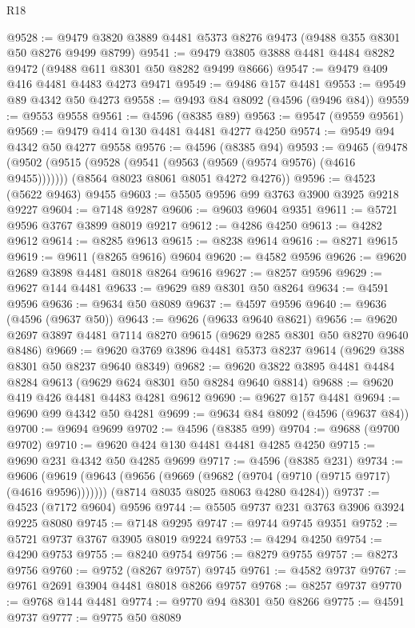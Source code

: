 \begin{lexlean}{R18}
\begin{coremodule}
@9528 := @9479 @3820 @3889 @4481 @5373 @8276 @9473 (@9488 @355 @8301 @50 @8276 @9499 @8799)
@9541 := @9479 @3805 @3888 @4481 @4484 @8282 @9472 (@9488 @611 @8301 @50 @8282 @9499 @8666)
@9547 := @9479 @409 @416 @4481 @4483 @4273 @9471
@9549 := @9486 @157 @4481
@9553 := @9549 @89 @4342 @50 @4273
@9558 := @9493 @84 @8092 (@4596 (@9496 @84))
@9559 := @9553 @9558
@9561 := @4596 (@8385 @89)
@9563 := @9547 (@9559 @9561)
@9569 := @9479 @414 @130 @4481 @4481 @4277 @4250
@9574 := @9549 @94 @4342 @50 @4277 @9558
@9576 := @4596 (@8385 @94)
@9593 := @9465
    (@9478
      (@9502 (@9515 (@9528 (@9541 (@9563 (@9569 (@9574 @9576) (@4616 @9455)))))))
      (@8564 @8023 @8061 @8051 @4272 @4276))
@9596 := @4523 (@5622 @9463) @9455
@9603 := @5505 @9596 @99 @3763 @3900 @3925 @9218 @9227
@9604 := @7148 @9287
@9606 := @9603 @9604 @9351
@9611 := @5721 @9596 @3767 @3899 @8019 @9217
@9612 := @4286 @4250
@9613 := @4282 @9612
@9614 := @8285 @9613
@9615 := @8238 @9614
@9616 := @8271 @9615
@9619 := @9611 (@8265 @9616) @9604
@9620 := @4582 @9596
@9626 := @9620 @2689 @3898 @4481 @8018 @8264 @9616
@9627 := @8257 @9596
@9629 := @9627 @144 @4481
@9633 := @9629 @89 @8301 @50 @8264
@9634 := @4591 @9596
@9636 := @9634 @50 @8089
@9637 := @4597 @9596
@9640 := @9636 (@4596 (@9637 @50))
@9643 := @9626 (@9633 @9640 @8621)
@9656 := @9620 @2697 @3897 @4481 @7114 @8270 @9615 (@9629 @285 @8301 @50 @8270 @9640 @8486)
@9669 := @9620 @3769 @3896 @4481 @5373 @8237 @9614 (@9629 @388 @8301 @50 @8237 @9640 @8349)
@9682 := @9620 @3822 @3895 @4481 @4484 @8284 @9613 (@9629 @624 @8301 @50 @8284 @9640 @8814)
@9688 := @9620 @419 @426 @4481 @4483 @4281 @9612
@9690 := @9627 @157 @4481
@9694 := @9690 @99 @4342 @50 @4281
@9699 := @9634 @84 @8092 (@4596 (@9637 @84))
@9700 := @9694 @9699
@9702 := @4596 (@8385 @99)
@9704 := @9688 (@9700 @9702)
@9710 := @9620 @424 @130 @4481 @4481 @4285 @4250
@9715 := @9690 @231 @4342 @50 @4285 @9699
@9717 := @4596 (@8385 @231)
@9734 := @9606
    (@9619
      (@9643 (@9656 (@9669 (@9682 (@9704 (@9710 (@9715 @9717) (@4616 @9596)))))))
      (@8714 @8035 @8025 @8063 @4280 @4284))
@9737 := @4523 (@7172 @9604) @9596
@9744 := @5505 @9737 @231 @3763 @3906 @3924 @9225 @8080
@9745 := @7148 @9295
@9747 := @9744 @9745 @9351
@9752 := @5721 @9737 @3767 @3905 @8019 @9224
@9753 := @4294 @4250
@9754 := @4290 @9753
@9755 := @8240 @9754
@9756 := @8279 @9755
@9757 := @8273 @9756
@9760 := @9752 (@8267 @9757) @9745
@9761 := @4582 @9737
@9767 := @9761 @2691 @3904 @4481 @8018 @8266 @9757
@9768 := @8257 @9737
@9770 := @9768 @144 @4481
@9774 := @9770 @94 @8301 @50 @8266
@9775 := @4591 @9737
@9777 := @9775 @50 @8089

\end{coremodule}
\end{lexlean}
